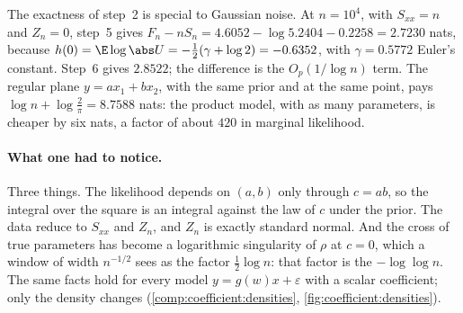 \begin{refsection}
The exactness of step~2 is special to Gaussian noise. At $n=10^4$, with $S_{xx}=n$ and $Z_n=0$, step~5 gives $F_n-nS_n=4.6052-\log5.2404-0.2258=2.7230$ nats, because $h(0)=\E\log\abs U=-\frac12(\gamma+\log2)=-0.6352$, with $\gamma=0.5772$ Euler's constant. Step~6 gives $2.8522$; the difference is the $O_p(1/\log n)$ term. The regular plane $y=ax_1+bx_2$, with the same prior and at the same point, pays $\log n+\log\frac2\pi=8.7588$ nats: the product model, with as many parameters, is cheaper by six nats, a factor of about $420$ in marginal likelihood.

\paragraph{What one had to notice.} Three things. The likelihood depends on $(a,b)$ only through $c=ab$, so the integral over the square is an integral against the law of $c$ under the prior. The data reduce to $S_{xx}$ and $Z_n$, and $Z_n$ is exactly standard normal. And the cross of true parameters has become a logarithmic singularity of $\rho$ at $c=0$, which a window of width $n^{-1/2}$ sees as the factor $\frac12\log n$: that factor is the $-\log\log n$. The same facts hold for every model $y=g(w)x+\varepsilon$ with a scalar coefficient; only the density changes (\cref{comp:coefficient:densities}, \cref{fig:coefficient:densities}).


\end{refsection}
